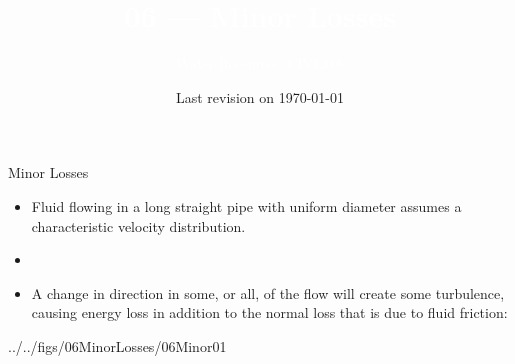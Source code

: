 \documentclass[9pt,xcolor={svgnames, x11names},professionalfonts, mathserif]{beamer}
\begin{document}
\title[Minor Losses]{\Huge \textcolor{white}{06 --- Minor Losses}}
\subtitle[CIVL318]{\Large\textcolor{white}{Water Resources, CIVL318}}
\author{}
\institute{}
\date{Last revision on \today}



\begin{frame}[plain]    %
 \titlepage
\end{frame}






\begin{frame}{Minor Losses}

 \begin{itemize}
  \item Fluid flowing in a long straight pipe with uniform diameter assumes a characteristic velocity distribution.
  \item []
  \item A change in direction in some, or all, of the flow will create some turbulence, causing energy loss in
        addition to the normal loss that is due to fluid friction:
 \end{itemize}
 \par\vspace{-0.5cm}
 \begin{cfig}[0.35]{../../figs/06MinorLosses/06Minor01}\end{cfig}



\end{frame}

\end{document}
